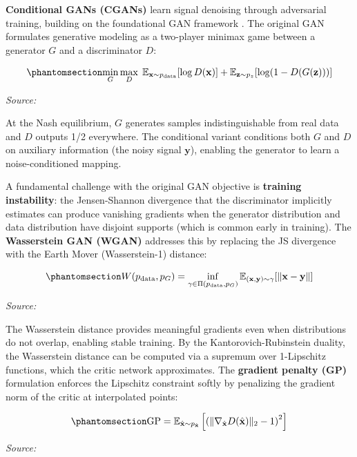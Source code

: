 \textbf{Conditional GANs (CGANs)} \cite{mirza2014conditional} learn signal denoising through adversarial training, building on the foundational GAN framework \cite{goodfellow2014generative}. The original GAN formulates generative modeling as a two-player minimax game between a generator \(G\) and a discriminator \(D\):

\begin{equation}\protect\phantomsection\label{eq:gan-minimax}{\min_G \max_D \; \mathbb{E}_{\mathbf{x} \sim p_{\text{data}}}[\log D(\mathbf{x})] + \mathbb{E}_{\mathbf{z} \sim p_z}[\log(1 - D(G(\mathbf{z})))]
}\end{equation} \par{\small\textit{Source: \cite{goodfellow2014generative}}}

At the Nash equilibrium, \(G\) generates samples indistinguishable from real data and \(D\) outputs 1/2 everywhere. The conditional variant conditions both \(G\) and \(D\) on auxiliary information (the noisy signal \(\mathbf{y}\)), enabling the generator to learn a noise-conditioned mapping.

A fundamental challenge with the original GAN objective is \textbf{training instability}: the Jensen-Shannon divergence that the discriminator implicitly estimates can produce vanishing gradients when the generator distribution and data distribution have disjoint supports (which is common early in training). The \textbf{Wasserstein GAN (WGAN)} addresses this by replacing the JS divergence with the Earth Mover (Wasserstein-1) distance:

\begin{equation}\protect\phantomsection\label{eq:wasserstein-distance}{W(p_{\text{data}}, p_G) = \inf_{\gamma \in \Pi(p_{\text{data}}, p_G)} \mathbb{E}_{(\mathbf{x}, \mathbf{y}) \sim \gamma}[\|\mathbf{x} - \mathbf{y}\|]
}\end{equation} \par{\small\textit{Source: \cite{gulrajani2017improved}}}

The Wasserstein distance provides meaningful gradients even when distributions do not overlap, enabling stable training. By the Kantorovich-Rubinstein duality, the Wasserstein distance can be computed via a supremum over 1-Lipschitz functions, which the critic network approximates. The \textbf{gradient penalty (GP)} formulation \cite{gulrajani2017improved} enforces the Lipschitz constraint softly by penalizing the gradient norm of the critic at interpolated points:

\begin{equation}\protect\phantomsection\label{eq:gradient-penalty}{\text{GP} = \mathbb{E}_{\hat{\mathbf{x}} \sim p_{\hat{\mathbf{x}}}}\left[\left(\|\nabla_{\hat{\mathbf{x}}} D(\hat{\mathbf{x}})\|_2 - 1\right)^2\right]
}\end{equation} \par{\small\textit{Source: \cite{gulrajani2017improved}}}

